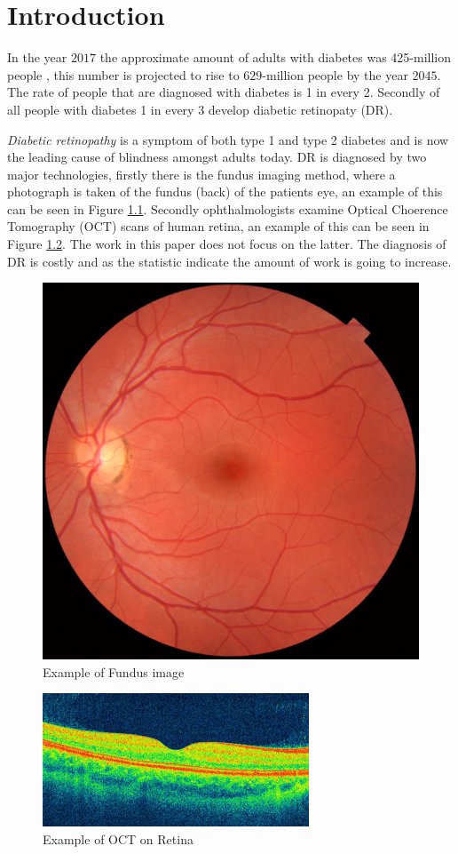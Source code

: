 \chapter{Introduction\label{cha:introduction}}

In the year $2017$ the approximate amount of adults with diabetes was 425-million people \cite{Intro_FactsandFigures}, this number is 
projected to rise to $629$-million people by the year $2045$. The rate of people that are diagnosed with diabetes 
is 1 in every 2. Secondly of all people with diabetes 1 in every 3 develop diabetic retinopaty (DR)\cite{Intro_DiabetesRate}.

\textit{Diabetic retinopathy} is a symptom of both type 1 and type 2 diabetes and is now the leading cause of blindness amongst adults today. DR is 
diagnosed by two major technologies, firstly there is the fundus imaging method, where a photograph is taken of the fundus (back) 
of the patients eye, an example of this can be seen in Figure \ref{fig:fundus-image1}. Secondly ophthalmologists examine 
Optical Choerence Tomography (OCT) scans of human retina, an example of this can be seen in Figure \ref{fig:oct-retina1}. 
The work in this paper does not focus on the latter. The diagnosis of DR is costly and as the statistic indicate 
the amount of work is going to increase.

\begin{figure}[h]
  \centering
  \includegraphics[width=.3\linewidth]{../graphics/fundus_image1.jpg}
  \caption{Example of Fundus image}
  \label{fig:fundus-image1}
\end{figure}
\begin{figure}[h]
  \centering
  \includegraphics[width=.5\linewidth]{../graphics/oct_fundus.png}
  \caption{Example of OCT on Retina}
  \label{fig:oct-retina1}
\end{figure}

